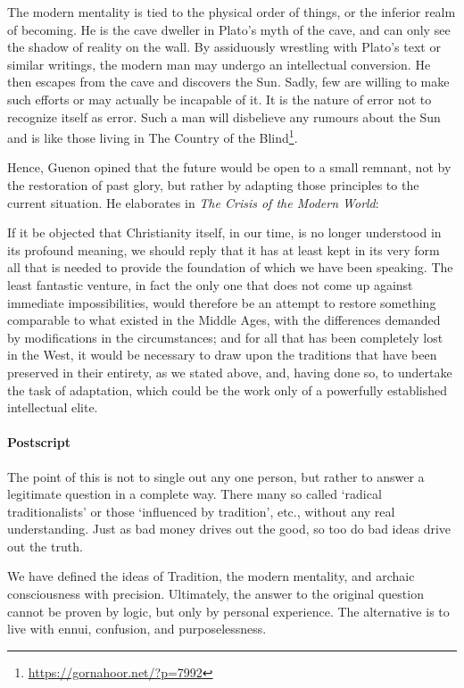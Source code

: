 The modern mentality is tied to the physical order of things, or the inferior realm of becoming. He is the cave dweller in Plato's myth of the cave, and can only see the shadow of reality on the wall. By assiduously wrestling with Plato's text or similar writings, the modern man may undergo an intellectual conversion. He then escapes from the cave and discovers the Sun. Sadly, few are willing to make such efforts or may actually be incapable of it. It is the nature of error not to recognize itself as error. Such a man will disbelieve any rumours about the Sun and is like those living in The Country of the Blind\footnote{\url{https://gornahoor.net/?p=7992}}.

Hence, Guenon opined that the future would be open to a small remnant, not by the restoration of past glory, but rather by adapting those principles to the current situation. He elaborates in \emph{The Crisis of the Modern World}:

\begin{quotex}
If it be objected that Christianity itself, in our time, is no longer understood in its profound meaning, we should reply that it has at least kept in its very form all that is needed to provide the foundation of which we have been speaking. The least fantastic venture, in fact the only one that does not come up against immediate impossibilities, would therefore be an attempt to restore something comparable to what existed in the Middle Ages, with the differences demanded by modifications in the circumstances; and for all that has been completely lost in the West, it would be necessary to draw upon the traditions that have been preserved in their entirety, as we stated above, and, having done so, to undertake the task of adaptation, which could be the work only of a powerfully established intellectual elite.
\end{quotex}

\paragraph{Postscript} The point of this is not to single out any one person, but rather to answer a legitimate question in a complete way. There many so called `radical traditionalists' or those `influenced by tradition', etc., without any real understanding. Just as bad money drives out the good, so too do bad ideas drive out the truth.

We have defined the ideas of Tradition, the modern mentality, and archaic consciousness with precision. Ultimately, the answer to the original question cannot be proven by logic, but only by personal experience. The alternative is to live with ennui, confusion, and purposelessness.

